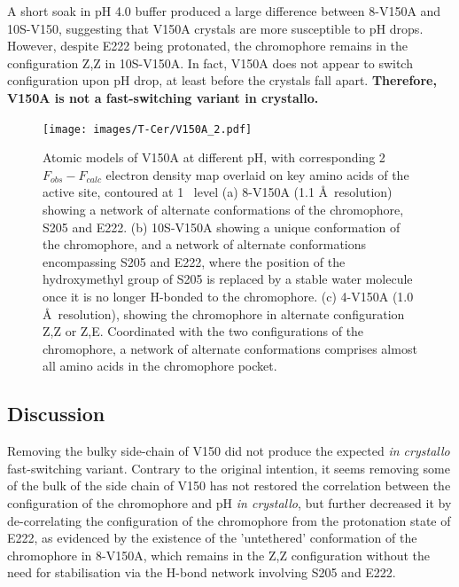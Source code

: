 \vspace{2mm}

A short soak in pH 4.0 buffer produced a large difference between 8-V150A and 10S-V150, suggesting that V150A crystals are more susceptible to pH drops. However, despite E222 being protonated, the chromophore remains in the configuration Z,Z in 10S-V150A. In fact, V150A does not appear to switch configuration upon pH drop, at least before the crystals fall apart. \textbf{Therefore, V150A is not a fast-switching variant in crystallo. }
\begin{figure}[H] 
    \centering
        \noindent \texttt{[image: images/T-Cer/V150A\_2.pdf]}
    \caption{Atomic models of  V150A at different pH, with corresponding 2\(F_{obs} - F_{calc}\) electron density map overlaid on key amino acids of the active site, contoured at 1 \textsigma\ level (a)  8-V150A (1.1 \AA\ resolution) showing a network of alternate conformations of the chromophore,  S205 and E222. (b) 10S-V150A showing a unique conformation of the chromophore, and a network of alternate conformations encompassing S205 and E222, where the position of the hydroxymethyl group of S205 is replaced by a stable water molecule once it is no longer H-bonded to the chromophore. (c) 4-V150A (1.0 \AA\ resolution), showing the chromophore in alternate configuration Z,Z or Z,E. Coordinated with the two configurations of the chromophore, a network of alternate conformations comprises almost all amino acids in the chromophore pocket.}\label{fig:V150Astructure}
\end{figure}
\subsection{Discussion}

Removing the bulky side-chain of V150 did not produce the expected  \textit{in crystallo} fast-switching variant. Contrary to the original intention, it seems removing some of the bulk of the side chain of V150 has not restored the correlation between the configuration of the chromophore and pH \textit{in crystallo}, but further decreased it by de-correlating the configuration of the chromophore from the protonation state of E222, as evidenced by the existence of the 'untethered' conformation of the chromophore in 8-V150A, which remains in the Z,Z configuration without the need for stabilisation via the H-bond network involving S205 and E222. 

\vspace{2mm}

